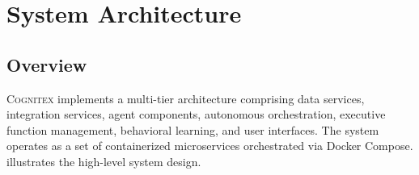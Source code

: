 \documentclass[11pt,a4paper]{article}
\newcommand{\cognitex}{\textsc{Cognitex}}
\begin{document}
\section{System Architecture}
\label{sec:architecture}

\subsection{Overview}

\cognitex{} implements a multi-tier architecture comprising data services, integration services, agent components, autonomous orchestration, executive function management, behavioral learning, and user interfaces. The system operates as a set of containerized microservices orchestrated via Docker Compose.  illustrates the high-level system design.
\end{document}
